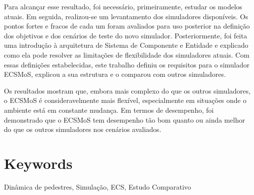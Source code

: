 \documentclass[twoside, 11pt]{article}
\begin{document}
Para alcançar esse resultado, foi necessário, primeiramente, estudar os modelos atuais. Em seguida, realizou-se um levantamento dos simuladores disponíveis. Os pontos fortes e fracos de cada um foram avaliados para uso posterior na definição dos objetivos e dos cenários de teste do novo simulador. Posteriormente, foi feita uma introdução à arquitetura de Sistema de Componente e Entidade e explicado como ela pode resolver as limitações de flexibilidade dos simuladores atuais. Com essas definições estabelecidas, este trabalho definiu os requisitos para o simulador ECSMoS, explicou a sua estrutura e o comparou com outros simuladores.

Os resultados mostram que, embora mais complexo do que os outros simuladores, o ECSMoS é consideravelmente mais flexível, especialmente em situações onde o ambiente está em constante mudança. Em termos de desempenho, foi demonstrado que o ECSMoS tem desempenho tão bom quanto ou ainda melhor do que os outros simuladores nos cenários avaliados.

\section*{Keywords}

Dinâmica de pedestres, Simulação, ECS, Estudo Comparativo

\clearpage            %
\null                %
\newpage             %

\printglossary[type=\acronymtype,nogroupskip=true,nonumberlist, title=List of Abbreviations]

\clearpage            %
\null                %
\newpage             %

\renewcommand{\contentsname}{General Index}
\tableofcontents

\clearpage            %
\null                %
\newpage             %

\renewcommand{\listfigurename}{Figure Index}
\listoffigures

\clearpage            %
\null                %
\newpage             %

\renewcommand{\listtablename}{Table Index}
\listoftables
\end{document}
